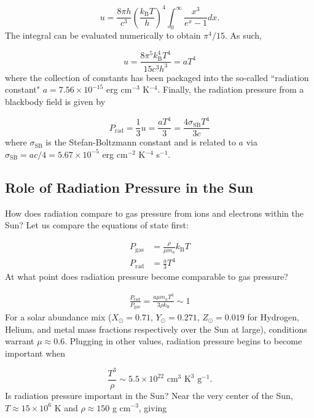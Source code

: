 \documentclass[12pt]{article}
\newcommand{\bigparenthesis}[1]{\left(#1\right)}
\begin{document}
\begin{equation}
    u = \frac{8\pi h}{c^3} \bigparenthesis{\frac{k_\mathrm{B}T}{h}}^{4} \int_0^{\infty} \frac{x^3}{e^{x} - 1} dx.
\end{equation}
%
The integral can be evaluated numerically to obtain $\pi^4 /15$. As such, 

\begin{equation}
    u = \frac{8\pi^5 k_\mathrm{B}^4 T^4}{15 c^3 h^3} = a T^4
\end{equation}
%
where the collection of constants has been packaged into the so-called ``radiation constant" $a = 7.56\times10^{-15}$ erg cm$^{-3}$ K$^{-4}$. Finally, the radiation pressure from a blackbody field is given by

\begin{equation}
    P_\mathrm{rad} = \frac{1}{3} u = \frac{aT^4}{3} = \frac{4\sigma_\mathrm{SB}T^4}{3c}
\end{equation}
%
where $\sigma_\mathrm{SB}$ is the Stefan-Boltzmann constant and is related to $a$ via $\sigma_\mathrm{SB} = ac/4 = 5.67 \times 10^{-5}$ erg cm$^{-2}$ K$^{-4}$ s$^{-1}$.

\subsection{Role of Radiation Pressure in the Sun}
How does radiation compare to gas pressure from ions and electrons within the Sun? Let us compare the equations of state first:

\begin{align}
    P_\mathrm{gas} &= \frac{\rho}{\mu m_a} k_\mathrm{B} T \\
    P_\mathrm{rad} &= \frac{a}{3} T^4
\end{align}
%
At what point does radiation pressure become comparable to gas pressure?

\begin{align}
    \frac{P_\mathrm{rad}}{P_\mathrm{gas}} = \frac{a\mu m_a T^3}{3\rho k_\mathrm{B}} \sim 1
\end{align}
%
For a solar abundance mix ($X_\odot = 0.71$, $Y_\odot = 0.271$, $Z_\odot = 0.019$ for Hydrogen, Helium, and metal mass fractions respectively over the Sun at large), conditions warrant $\mu \approx 0.6$. Plugging in other values, radiation pressure begins to become important when

\begin{equation}
    \frac{T^3}{\rho} \sim 5.5 \times 10^{22} \text{ cm}^{3} \text{ K}^{3} \text{ g}^{-1}.
\end{equation}
%
Is radiation pressure important in the Sun? Near the very center of the Sun, $T \approx 15 \times 10^6$ K and $\rho \approx 150 $ g cm$^{-3}$, giving
\end{document}
